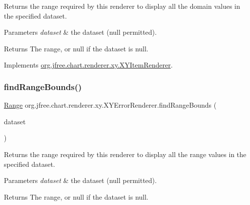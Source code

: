 Returns the range required by this renderer to display all the domain values in the specified dataset.


\begin{DoxyParams}{Parameters}
{\em dataset} & the dataset ({\ttfamily null} permitted).\\
\hline
\end{DoxyParams}
\begin{DoxyReturn}{Returns}
The range, or {\ttfamily null} if the dataset is {\ttfamily null}. 
\end{DoxyReturn}


Implements \mbox{\hyperlink{interfaceorg_1_1jfree_1_1chart_1_1renderer_1_1xy_1_1_x_y_item_renderer_a77925018c73214f58daac73147ba5e52}{org.\+jfree.\+chart.\+renderer.\+xy.\+X\+Y\+Item\+Renderer}}.

\mbox{\label{classorg_1_1jfree_1_1chart_1_1renderer_1_1xy_1_1_x_y_error_renderer_a3e48bd5bc9bb32456da3ff4a634b9fb3}} 
\subsubsection{\texorpdfstring{find\+Range\+Bounds()}{findRangeBounds()}}
{\footnotesize\ttfamily \mbox{\hyperlink{classorg_1_1jfree_1_1data_1_1_range}{Range}} org.\+jfree.\+chart.\+renderer.\+xy.\+X\+Y\+Error\+Renderer.\+find\+Range\+Bounds (\begin{DoxyParamCaption}\item[{\mbox{\hyperlink{interfaceorg_1_1jfree_1_1data_1_1xy_1_1_x_y_dataset}{X\+Y\+Dataset}}}]{dataset }\end{DoxyParamCaption})}

Returns the range required by this renderer to display all the range values in the specified dataset.


\begin{DoxyParams}{Parameters}
{\em dataset} & the dataset ({\ttfamily null} permitted).\\
\hline
\end{DoxyParams}
\begin{DoxyReturn}{Returns}
The range, or {\ttfamily null} if the dataset is {\ttfamily null}. 
\end{DoxyReturn}


